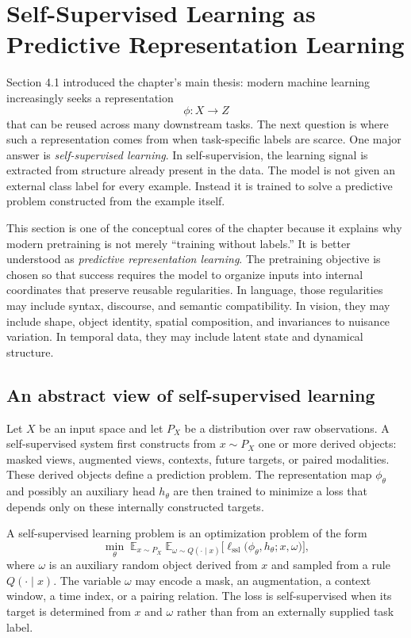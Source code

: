 \section[Self-Supervised Learning]{Self-Supervised Learning as Predictive Representation Learning}

Section 4.1 introduced the chapter's main thesis: modern machine learning increasingly seeks a representation
\[
\phi : X \to Z
\]
that can be reused across many downstream tasks.
The next question is where such a representation comes from when task-specific labels are scarce.
One major answer is \emph{self-supervised learning}.
In self-supervision, the learning signal is extracted from structure already present in the data.
The model is not given an external class label for every example.
Instead it is trained to solve a predictive problem constructed from the example itself.

\medskip

This section is one of the conceptual cores of the chapter because it explains why modern pretraining is not merely ``training without labels.''
It is better understood as \emph{predictive representation learning}.
The pretraining objective is chosen so that success requires the model to organize inputs into internal coordinates that preserve reusable regularities.
In language, those regularities may include syntax, discourse, and semantic compatibility.
In vision, they may include shape, object identity, spatial composition, and invariances to nuisance variation.
In temporal data, they may include latent state and dynamical structure.

\subsection*{An abstract view of self-supervised learning}

Let $X$ be an input space and let $P_X$ be a distribution over raw observations.
A self-supervised system first constructs from $x \sim P_X$ one or more derived objects: masked views, augmented views, contexts, future targets, or paired modalities.
These derived objects define a prediction problem.
The representation map $\phi_\theta$ and possibly an auxiliary head $h_\theta$ are then trained to minimize a loss that depends only on these internally constructed targets.

\begin{definition}
A self-supervised learning problem is an optimization problem of the form
\[
\min_{\theta}
\; \mathbb{E}_{x \sim P_X}
\; \mathbb{E}_{\omega \sim Q(\cdot \mid x)}
\big[
\ell_{\mathrm{ssl}}\big(\phi_\theta, h_\theta; x, \omega\big)
\big],
\]
where $\omega$ is an auxiliary random object derived from $x$ and sampled from a rule $Q(\cdot \mid x)$.
The variable $\omega$ may encode a mask, an augmentation, a context window, a time index, or a pairing relation.
The loss is self-supervised when its target is determined from $x$ and $\omega$ rather than from an externally supplied task label.
\end{definition}


